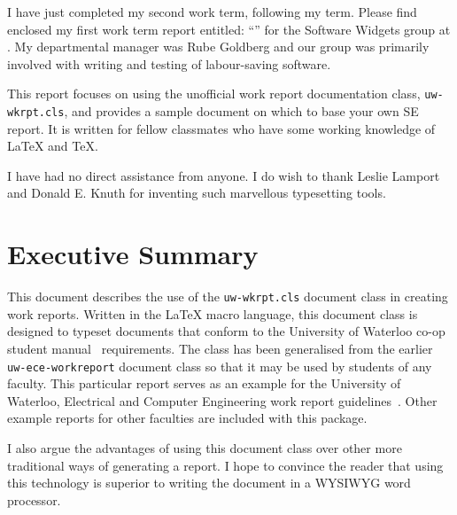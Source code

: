\documentclass{uw-wkrpt}
\begin{document}
\begin{letter}
I have just completed my second work term, following my \theterm{} term.
Please find enclosed my first work term report entitled:
``\thetitle'' for the Software Widgets group at \theemployer.  
My departmental manager was Rube Goldberg
and our group was primarily involved with writing and testing
of labour-saving software.

This report focuses on using the unofficial work report
documentation class, \texttt{uw-wkrpt.cls}, and provides a
sample document on which to base your own SE report.  It is written for
fellow classmates who have some working knowledge of \LaTeX{} and \TeX{}.

I have had no direct assistance from anyone.  I do wish to thank Leslie 
Lamport and Donald E. Knuth for inventing such marvellous typesetting
tools.

\end{letter}

\section{Executive Summary}
This document describes the use of the \texttt{uw-wkrpt.cls}
document class in creating work reports.  Written in the 
\LaTeX{} macro language, this document class is designed to typeset 
documents that conform to the University of Waterloo co-op student 
manual~\cite{ref:coopman} requirements.  The class has been generalised
from the earlier \texttt{uw-ece-workreport} document class so that it
may be used by students of any faculty.  This particular report 
serves as an example for the University of Waterloo, Electrical and 
Computer Engineering work report guidelines~\cite{ref:eceguidelines}.  
Other example reports for other faculties are included with this package.

I also argue the advantages of using this document class over other
more traditional ways of generating a report.  I hope to convince the
reader that using this technology is superior to writing the document
in a WYSIWYG word processor.

\tableofcontents
\listoffigures
\listoftables
\end{document}

